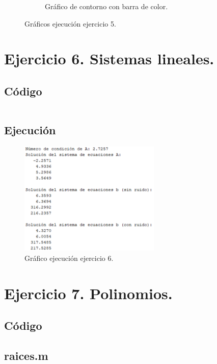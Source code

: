\documentclass[a4paper, 12pt]{article}
\begin{document}
\begin{figure}[ht]
\begin{subfigure}{0.49\textwidth}
			\caption{Gráfico de contorno con barra de color.}
			\label{grafica5.3}
		\end{subfigure}
		\caption{Gráficos ejecución ejercicio 5.}
		\label{graficos5}
	\end{figure}

        \newpage
	\section{Ejercicio 6. Sistemas lineales.}
	
	\subsection{Código}
	\inputminted[fontsize=\scriptsize, linenos, breaklines=true, xleftmargin=0.75cm, frame=lines]{matlab}{code/parte1/Ejercicio6.m}
	\subsection{Ejecución}
	\begin{figure}[htp!]
		\centering
		\includegraphics[width=0.6\textwidth]{figures/ejc6.png}
		\caption{Gráfico ejecución ejercicio 6.}
	\end{figure}
	
	\section{Ejercicio 7. Polinomios.}
	
	\subsection{Código}
	\subsection*{raices.m}
	\inputminted[fontsize=\scriptsize, linenos, breaklines=true, xleftmargin=0.75cm, frame=lines]{matlab}{code/parte1/raices.m}
	\inputminted[fontsize=\scriptsize, linenos, breaklines=true, xleftmargin=0.75cm, frame=lines]{matlab}{code/parte1/Ejercicio7.m}
	\newpage
\end{document}
